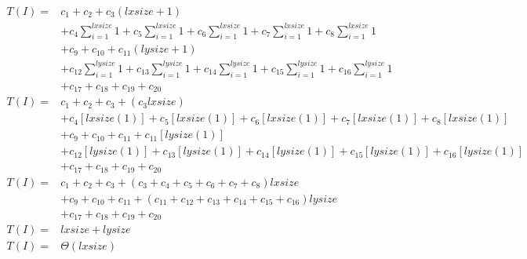\begin{equation}
	\label{eq:analyse-arlabeling}
	\begin{split}
		T(I) = &
		c_1
		+ c_2
		+ c_3 \left(\mathit{lxsize} + 1\right)\\
		& + c_4 \sum_{i=1}^{\mathit{lxsize}} 1
		+ c_5 \sum_{i=1}^{\mathit{lxsize}} 1
		+ c_6 \sum_{i=1}^{\mathit{lxsize}} 1
		+ c_7 \sum_{i=1}^{\mathit{lxsize}} 1
		+ c_8 \sum_{i=1}^{\mathit{lxsize}} 1\\
		& + c_9
		+ c_{10}
		+ c_{11} \left(\mathit{lysize} + 1\right)\\
		& + c_{12} \sum_{i=1}^{\mathit{lysize}} 1
		+ c_{13} \sum_{i=1}^{\mathit{lysize}} 1
		+ c_{14} \sum_{i=1}^{\mathit{lysize}} 1
		+ c_{15} \sum_{i=1}^{\mathit{lysize}} 1
		+ c_{16} \sum_{i=1}^{\mathit{lysize}} 1\\
		& + c_{17}
		+ c_{18}
		+ c_{19}
		+ c_{20}\\
		T(I) = &
		c_1
		+ c_2
		+ c_3
		+ \left(c_3 \mathit{lxsize}\right)\\
		& + c_4 \left[ \mathit{lxsize} \left(1\right) \right]
		+ c_5 \left[ \mathit{lxsize} \left(1\right) \right]
		+ c_6 \left[ \mathit{lxsize} \left(1\right) \right]
		+ c_7 \left[ \mathit{lxsize} \left(1\right) \right]
		+ c_8 \left[ \mathit{lxsize} \left(1\right) \right]\\
		& + c_9
		+ c_{10}
		+ c_{11}
		+ c_{11} \left[ \mathit{lysize} \left(1\right) \right]\\
		& + c_{12} \left[ \mathit{lysize} \left(1\right) \right]
		+ c_{13} \left[ \mathit{lysize} \left(1\right) \right]
		+ c_{14} \left[ \mathit{lysize} \left(1\right) \right]
		+ c_{15} \left[ \mathit{lysize} \left(1\right) \right]
		+ c_{16} \left[ \mathit{lysize} \left(1\right) \right]\\
		& + c_{17}
		+ c_{18}
		+ c_{19}
		+ c_{20}\\
		T(I) = &
		c_1
		+ c_2
		+ c_3
		+ \left( c_3 + c_4 + c_5 + c_6 + c_7 + c_8 \right) \mathit{lxsize}\\
		& + c_9
		+ c_{10}
		+ c_{11}
		+ \left( c_{11} + c_{12} + c_{13} + c_{14} + c_{15} + c_{16} \right) \mathit{lysize}\\
		& + c_{17}
		+ c_{18}
		+ c_{19}
		+ c_{20}\\
		T(I) = &
		\mathit{lxsize} + \mathit{lysize}\\
		T(I) = &
		\Theta\left( \mathit{lxsize} \right)
	\end{split}
\end{equation}

